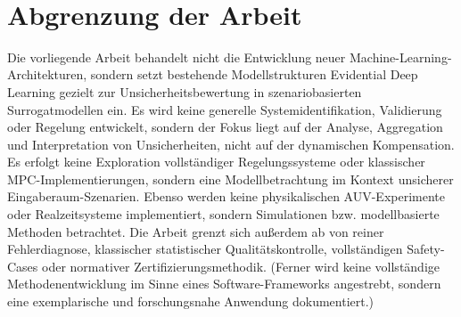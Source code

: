 ~\parencite{Pandey.30.11.2022}




\section{Abgrenzung der Arbeit}

Die vorliegende Arbeit behandelt nicht die Entwicklung neuer Machine-Learning-Architekturen, sondern setzt bestehende Modellstrukturen Evidential Deep Learning gezielt zur Unsicherheitsbewertung in szenariobasierten Surrogatmodellen ein. Es wird keine generelle Systemidentifikation, Validierung oder Regelung entwickelt, sondern der Fokus liegt auf der Analyse, Aggregation und Interpretation von Unsicherheiten, nicht auf der dynamischen Kompensation.
Es erfolgt keine Exploration vollständiger Regelungssysteme oder klassischer MPC-Implementierungen, sondern eine Modellbetrachtung im Kontext unsicherer Eingaberaum-Szenarien. Ebenso werden keine physikalischen AUV-Experimente oder Realzeitsysteme implementiert, sondern Simulationen bzw. modellbasierte Methoden betrachtet. Die Arbeit grenzt sich außerdem ab von reiner Fehlerdiagnose, klassischer statistischer Qualitätskontrolle, vollständigen Safety-Cases oder normativer Zertifizierungsmethodik. (Ferner wird keine vollständige Methodenentwicklung im Sinne eines Software-Frameworks angestrebt, sondern eine exemplarische und forschungsnahe Anwendung dokumentiert.)
